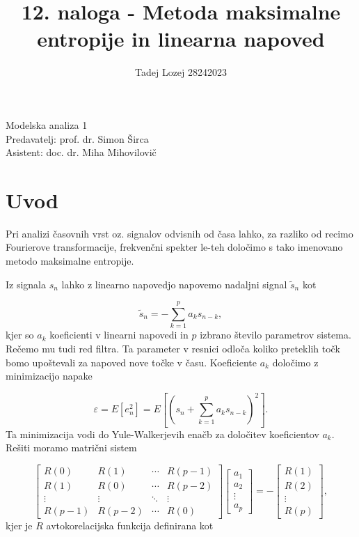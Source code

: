 \documentclass[slovene,11pt,a4paper]{article}
\begin{document}
\title{12. naloga - Metoda maksimalne entropije in linearna napoved}
\author{Tadej Lozej 28242023}
\maketitle
\begin{center}
Modelska analiza 1 \\
\bigskip
Predavatelj: prof. dr. Simon Širca \\
Asistent: doc. dr. Miha Mihovilovič
\end{center}

\newpage

\tableofcontents

\newpage

\section{Uvod}


Pri analizi časovnih vrst oz. signalov odvisnih od časa lahko, za razliko od recimo Fourierove transformacije, frekvenčni spekter le-teh določimo s tako imenovano metodo maksimalne entropije.

Iz signala $s_n$ lahko z linearno napovedjo napovemo nadaljni signal $\tilde{s}_n$ kot

\begin{equation}
\tilde{s}_n = - \sum_{k=1}^p a_k s_{n-k},
\end{equation}
kjer so $a_k$ koeficienti v linearni napovedi in $p$ izbrano število parametrov sistema. Rečemo mu tudi red filtra. Ta parameter v resnici odloča koliko preteklih točk bomo upoštevali za napoved nove točke v času. Koeficiente $a_k$ določimo z minimizacijo napake

\begin{equation}
\varepsilon = E[e_n^2] = E[(s_n + \sum_{k=1}^p a_k s_{n-k})^2].
\end{equation}
Ta minimizacija vodi do Yule-Walkerjevih enačb za določitev koeficientov $a_k$. Rešiti moramo matrični sistem

\begin{equation}
\begin{bmatrix}
R(0) & R(1) & \cdots & R(p-1) \\
R(1) & R(0) & \cdots & R(p-2) \\
\vdots & \vdots & \ddots & \vdots \\
R(p-1) & R(p-2) & \cdots & R(0)
\end{bmatrix}
\begin{bmatrix}
a_1 \\
a_2 \\
\vdots \\
a_p
\end{bmatrix}
=
-
\begin{bmatrix}
R(1) \\
R(2) \\
\vdots \\
R(p)
\end{bmatrix},
\end{equation}
kjer je $R$ avtokorelacijska funkcija definirana kot
\end{document}
